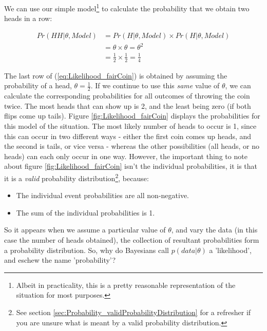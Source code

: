 \documentclass[11pt,fullpage]{book}
\begin{document}
We can use our simple model\footnote{Albeit in practicality, this is a pretty reasonable representation of the situation for most purposes.} to calculate the probability that we obtain two heads in a row:

\begin{equation}
\begin{align}
Pr(HH|\theta,Model) &= Pr(H|\theta,Model)\times Pr(H|\theta,Model)\\
&= \theta \times \theta = \theta^2\\ 
&= \frac{1}{2}\times \frac{1}{2} = \frac{1}{4}
\end{align}
\end{equation}\label{eq:Likelihood_fairCoin}

The last row of (\ref{eq:Likelihood_fairCoin}) is obtained by assuming the probability of a head, $\theta=\frac{1}{2}$. If we continue to use this \textit{same} value of $\theta$, we can calculate the corresponding probabilities for all outcomes of throwing the coin twice. The most heads that can show up is 2, and the least being zero (if both flips come up tails). Figure \ref{fig:Likelihood_fairCoin} displays the probabilities for this model of the situation. The most likely number of heads to occur is 1, since this can occur in two different ways - either the first coin comes up heads, and the second is tails, or vice versa - whereas the other possibilities (all heads, or no heads) can each only occur in one way. However, the important thing to note about figure \ref{fig:Likelihood_fairCoin} isn't the individual probabilities, it is that it is a \textit{valid} probability distribution\footnote{See section \ref{sec:Probability_validProbabilityDistribution} for a refresher if you are unsure what is meant by a valid probability distribution.}, because:

\begin{itemize}
\item The individual event probabilities are all non-negative.
\item The sum of the individual probabilities is 1.
\end{itemize}

So it appears when we assume a particular value of $\theta$, and vary the data (in this case the number of heads obtained), the collection of resultant probabilities form a probability distribution. So, why do Bayesians call $p(data|\theta)$ a 'likelihood', and eschew the name 'probability'?
\end{document}
